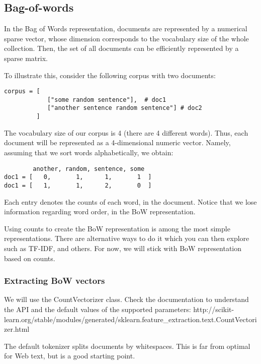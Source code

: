 \documentclass[11pt]{article}
\begin{document}
    \hypertarget{bag-of-words}{%
\subsection{ Bag-of-words}\label{bag-of-words}}

In the Bag of Words representation, documents are represented by a
numerical sparse vector, whose dimension corresponds to the vocabulary
size of the whole collection. Then, the set of all documents can be
efficiently represented by a sparse matrix.

To illustrate this, consider the following corpus with two documents:

\begin{verbatim}
corpus = [
            ["some random sentence"],  # doc1
            ["another sentence random sentence"] # doc2
         ]
\end{verbatim}

The vocabulary size of our corpus is 4 (there are 4 different words).
Thus, each document will be represented as a 4-dimensional numeric
vector. Namely, assuming that we sort words alphabetically, we obtain:

\begin{verbatim}
        another, random, sentence, some
doc1 = [   0,       1,      1,       1  ]
doc1 = [   1,       1,      2,       0  ] 
\end{verbatim}

Each entry denotes the counts of each word, in the document. Notice that
we lose information regarding word order, in the BoW representation.

Using counts to create the BoW representation is among the most simple
representations. There are alternative ways to do it which you can then
explore such as TF-IDF, and others. For now, we will stick with BoW
representation based on counts.

\hypertarget{extracting-bow-vectors}{%
\subsubsection{Extracting BoW vectors}\label{extracting-bow-vectors}}

We will use the CountVectorizer class. Check the documentation to
understand the API and the default values of the supported parameters:
http://scikit-learn.org/stable/modules/generated/sklearn.feature\_extraction.text.CountVectorizer.html

The default tokenizer splits documents by whitespaces. This is far from
optimal for Web text, but is a good starting point.
\end{document}
